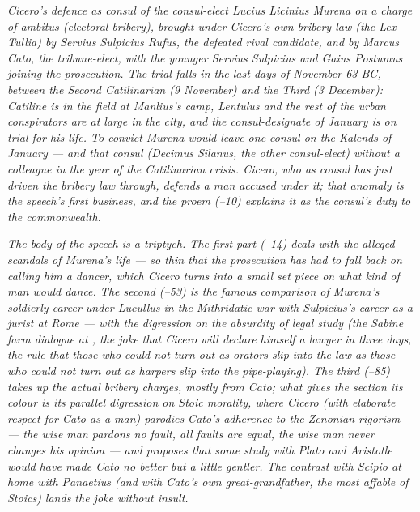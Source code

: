 
\textit{Cicero's defence as consul of the consul-elect Lucius
Licinius Murena on a charge of \textit{ambitus} (electoral
bribery), brought under Cicero's own bribery law (the Lex
Tullia) by Servius Sulpicius Rufus, the defeated rival
candidate, and by Marcus Cato, the tribune-elect, with the
younger Servius Sulpicius and Gaius Postumus joining the
prosecution. The trial falls in the last days of November 63
BC, between the Second Catilinarian (9 November) and the
Third (3 December): Catiline is in the field at Manlius's
camp, Lentulus and the rest of the urban conspirators are at
large in the city, and the consul-designate of January is on
trial for his life. To convict Murena would leave one consul
on the Kalends of January --- and that consul (Decimus
Silanus, the other consul-elect) without a colleague in the
year of the Catilinarian crisis. Cicero, who as consul has
just driven the bribery law through, defends a man accused
under it; that anomaly is the speech's first business, and the
proem (--10) explains it as the consul's duty
to the commonwealth.}

\textit{The body of the speech is a triptych. The first part
(--14) deals with the alleged scandals of
Murena's life --- so thin that the prosecution has had to
fall back on calling him a dancer, which Cicero turns into a
small set piece on what kind of man would dance. The second
(--53) is the famous comparison of Murena's
soldierly career under Lucullus in the Mithridatic war with
Sulpicius's career as a jurist at Rome --- with the digression
on the absurdity of legal study (the Sabine farm dialogue at
, the joke that Cicero will declare himself
a lawyer in three days, the rule that those who could not
turn out as orators slip into the law as those who could not
turn out as harpers slip into the pipe-playing). The third
(--85) takes up the actual bribery charges,
mostly from Cato; what gives the section its colour is its
parallel digression on Stoic morality, where Cicero (with
elaborate respect for Cato as a man) parodies Cato's
adherence to the Zenonian rigorism --- the wise man pardons
no fault, all faults are equal, the wise man never changes
his opinion --- and proposes that some study with Plato and
Aristotle would have made Cato no better but a little
gentler. The contrast with Scipio at home with Panaetius (and
with Cato's own great-grandfather, the most affable of
Stoics) lands the joke without insult.}

